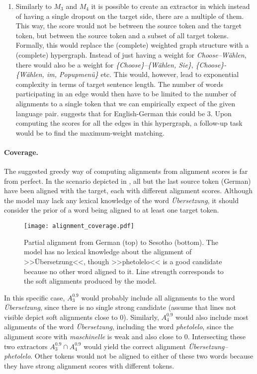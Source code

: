\begin{enumerate}
    \item Similarly to $M_3$ and $M_4$ it is possible to create an extractor in which instead of having a single dropout on the target side, there are a multiple of them. This way, the score would not be between the source token and the target token, but between the source token and a subset of all target tokens. Formally, this would replace the (complete) weighted graph structure with a (complete) hypergraph. Instead of just having a weight for \textit{Choose--Wählen}, there would also be a weight for \textit{\{Choose\}--\{Wählen, Sie\}}, \textit{\{Choose\}-\{Wählen, im, Popupmenü\}} etc. 
    This would, however, lead to exponential complexity in terms of target sentence length. The number of words participating in an edge would then have to be limited to the number of alignments to a single token that we can empirically expect of the given language pair.  suggests that for English-German this could be 3.
    Upon computing the scores for all the edges in this hypergraph, a follow-up task would be to find the maximum-weight matching.
\end{enumerate}

\vspace{-0.4cm}
\paragraph{Coverage.}

The suggested greedy way of computing alignments from alignment scores is far from perfect.
In the scenario depicted in , all but the last source token (German) have been aligned with the target, each with different alignment scores. Although the model may lack any lexical knowledge of the word \textit{Übersetzung}, it should consider the prior of a word being aligned to at least one target token.

\begin{figure}[h!]
    \center
    \texttt{[image: alignment\_coverage.pdf]}
    \caption{
        Partial alignment from German (top) to Sesotho (bottom). The model has no lexical knowledge about the alignment of >>Übersetzung<<, though >>phetolelo<< is a good candidate because no other word aligned to it. Line strength corresponds to the soft alignments produced by the model.
        \label{fig:alignment_coverage}
    }
\end{figure}

In this specific case, $A_3^{0.9}$ would probably include all alignments to the word \textit{Übersetzung}, since there is no single strong candidate (assume that lines not visible depict soft alignments close to $0$). Similarly, $A_4^{0.9}$ would also include most alignments of the word \textit{Übersetzung}, including the word \textit{phetolelo}, since the alignment score with \textit{maschinelle} is weak and also close to $0$. Intersecting these two extractors $A_3^{0.9} \cap A_4^{0.9}$ would yield the correct alignment \textit{Übersetzung--phetolelo}. Other tokens would not be aligned to either of these two words because they have strong alignment scores with different tokens.

